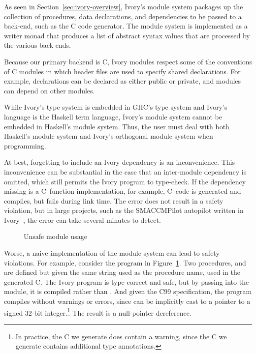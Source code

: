 As seen in Section~\ref{sec:ivory-overview}, Ivory's module system packages up
the collection of procedures, data declarations, and dependencies to be passed
to a back-end, such as the C code generator. The module system is implemented as
a writer monad that produces a list of abstract syntax values that are processed
by the various back-ends.

Because our primary backend is C, Ivory modules respect some of the conventions
of C modules in which header files are used to specify shared declarations. For
example, declarations can be declared as either public or private, and modules
can depend on other modules.

While Ivory's type system is embedded in GHC's type system and Ivory's language
is the Haskell term language, Ivory's module system cannot be embedded in
Haskell's module system. Thus, the user must deal with both Haskell's module
system and Ivory's orthogonal module system when programming.

At best, forgetting to include an Ivory dependency is an inconvenience. This
inconvenience can be substantial in the case that an inter-module dependency is
omitted, which still permits the Ivory program to type-check. If the dependency
missing is a C~function implementation, for example, C~code is generated and
compiles, but fails during link time. The error does not result in a safety
violation, but in large projects, such as the SMACCMPilot autopilot written in
Ivory~\cite{}, the error can take several minutes to detect.

\begin{figure}[h]
\caption{Unsafe module usage}
\label{fig:unsafe-module}
\end{figure}

Worse, a naive implementation of the module system can lead to safety
violations. For example, consider the program in
Figure~\ref{fig:unsafe-module}. Two procedures,  and 
are defined but given the same string used as the procedure name, used in the
generated C. The Ivory program is type-correct and safe, but by passing
 into the module, it is compiled rather than . And given
the C99 specification, the program compiles without warnings or errors, since
 can be implicitly cast to a pointer to a signed 32-bit
integer.\footnote{In practice, the C we generate does contain a warning, since
  the C we generate contains additional type annotations.} The result is a
null-pointer dereference.

